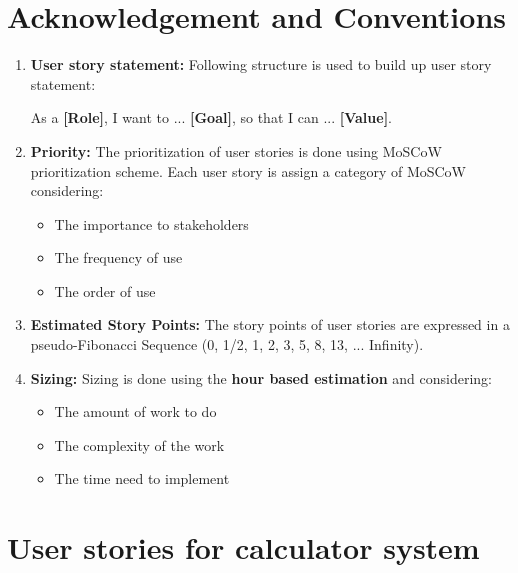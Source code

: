 \section{Acknowledgement and Conventions}
\begin{enumerate}
  \item \textbf{User story statement:} Following structure is used to build up user story statement:
  \begin{center}
  As a \textbf{[Role]}, I want to ... \textbf{[Goal]}, so that I can ... \textbf{ [Value]}.
  \end{center}
  \item \textbf{Priority:} The prioritization of user stories is done using MoSCoW prioritization scheme. Each user story is assign a category of MoSCoW considering:
    \begin{itemize}
  \item The importance to stakeholders
  \item The frequency of use
  \item The order of use
\end{itemize}
\item \textbf{Estimated Story Points:} The story points of user stories are expressed in a pseudo-Fibonacci Sequence (0, 1/2, 1, 2, 3, 5, 8, 13, ... Infinity).
  \item \textbf{Sizing:} Sizing is done using the\textbf{ hour based estimation} and considering:
  \begin{itemize}
  \item The amount of work to do
  \item The complexity of the work
  \item The time need to implement
\end{itemize}
\end{enumerate}
\section{User stories for calculator system}

